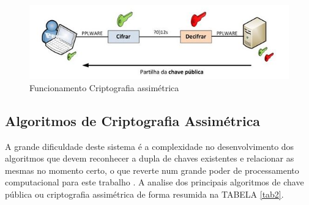 \documentclass[12pt]{article}
\begin{document}
 \begin{figure}[H]
	\includegraphics[]{assimetrica.JPG}
	\caption{Funcionamento Criptografia assimétrica}
	\label{cripto2}
\end{figure}

\subsection{Algoritmos de Criptografia Assimétrica}

A grande dificuldade deste sistema é a  complexidade  no  desenvolvimento  dos algoritmos que devem reconhecer a dupla de chaves existentes e relacionar as  mesmas  no  momento  certo,  o  que reverte num  grande  poder  de  processamento computacional para este trabalho \cite{STALLINGS:14}. A  analise  dos  principais  algoritmos  de  chave pública ou criptografia assimétrica de forma resumida na TABELA \ref{tab2}.
\end{document}
